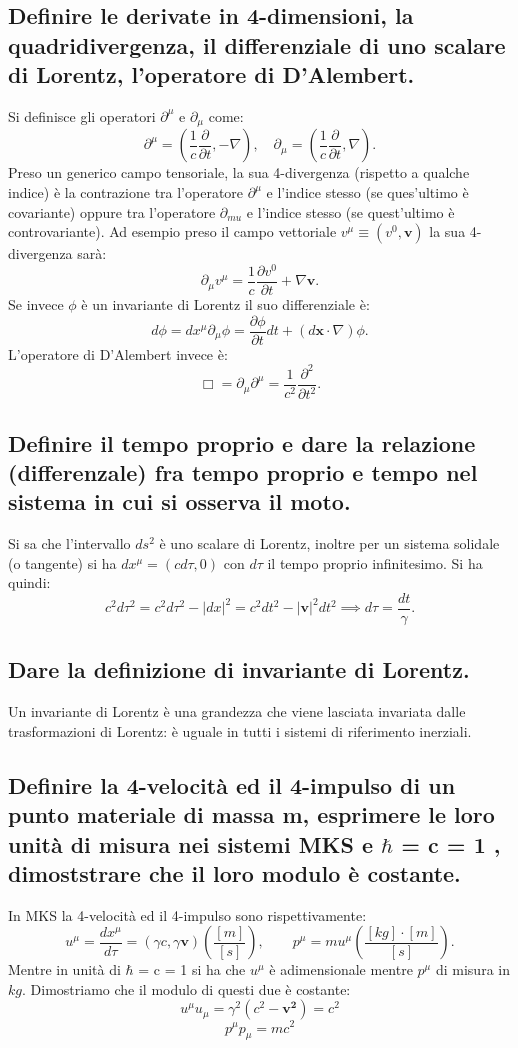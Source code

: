 \subsection[]{ Definire le derivate in 4-dimensioni, la quadridivergenza, il differenziale di uno scalare di Lorentz, l’operatore di D’Alembert.}
Si definisce gli operatori $\partial^{\mu}$ e $\partial_{\mu}$ come:
\[
	\partial^{\mu} = \left( \frac{1}{c} \frac{\partial}{\partial t} , - \nabla  \right) ,\quad
	\partial_{\mu} = \left(\frac{1}{c} \frac{\partial}{\partial t} ,  \nabla  \right)
.\] 
Preso un generico campo tensoriale, la sua 4-divergenza (rispetto a qualche indice) è la contrazione tra l'operatore $\partial^{\mu}$ e l'indice stesso (se ques'ultimo è covariante) oppure tra l'operatore $\partial_{mu}$ e l'indice stesso (se quest'ultimo è controvariante). Ad esempio preso il campo vettoriale $v^{\mu} \equiv \left(v^{0}, \boldsymbol{v}\right)$ la sua 4-divergenza sarà:
\[
\partial_{\mu}v^{\mu} = \frac{1}{c} \frac{\partial v^{0}}{\partial t} + \nabla \boldsymbol{v} 
.\]
Se invece $\phi$ è un invariante di Lorentz il suo differenziale è:
 \[
	 d\phi = dx^{\mu}\partial_{\mu}\phi = \frac{\partial\phi}{\partial t}dt + \left(d \boldsymbol{x}\cdot \nabla \right)\phi  
.\]
L'operatore di D'Alembert invece è: 
\[
	\Box = \partial_{\mu}\partial^{\mu} = \frac{1}{c^{2}}\frac{\partial^{2}}{\partial t^{2}}    
.\] 
\subsection[]{ Definire il tempo proprio e dare la relazione (differenzale) fra tempo proprio e tempo nel sistema in cui si osserva il moto.}
Si sa che l'intervallo $ds^{2}$ è uno scalare di Lorentz, inoltre per un sistema solidale (o tangente) si ha $dx^{\mu} = \left( cd\tau, 0 \right)$ con $d\tau$ il tempo proprio infinitesimo. Si ha quindi: 
\[
		c^{2}d\tau^{2} = c^{2}d\tau^{2} - |dx|^{2} = c^{2}dt^{2} -|\boldsymbol{v}|^{2}dt^{2} \implies d\tau = \frac{dt}{\gamma} 
.\] 
\subsection[]{ Dare la definizione di invariante di Lorentz.} 
Un invariante di Lorentz è una grandezza che viene lasciata invariata dalle trasformazioni di Lorentz: è uguale in tutti i sistemi di riferimento inerziali.
\subsection[]{ Definire la 4-velocità ed il 4-impulso di un punto materiale di massa m, esprimere le loro unità di misura nei sistemi MKS e $\hbar$ = c = 1 , dimoststrare che il loro modulo è costante.} 
In MKS la 4-velocità ed il 4-impulso sono rispettivamente:
\[
	u^{\mu} = \frac{dx^{\mu}}{d\tau} = \left( \gamma c, \gamma \boldsymbol{v}  \right) \left( \frac{[m]}{[s]}\right) , \quad \quad 
	p^{\mu} = mu^{\mu} \left( \frac{[kg] \cdot [m]}{[s]} \right) 
.\]
Mentre in unità di $\hbar$ = c = 1 si ha che $u^{\mu}$ è adimensionale mentre $p^{\mu}$ di misura in $kg$.
Dimostriamo che il modulo di questi due è costante:
\[
	u^{\mu}u_{\mu} = \gamma^{2}\left( c^{2} - \boldsymbol{v^{2}} \right) = c^{2} 
\]
 \[
	p^{\mu}p_{\mu} = mc^2
\] 
